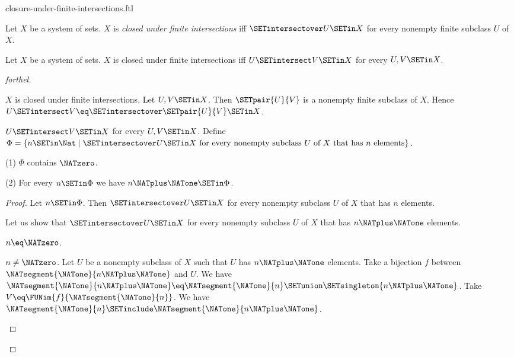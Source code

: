 \documentclass{naproche-library}
\begin{document}
\begin{smodule}[title=Closure Under Finite Intersections]{closure-under-finite-intersections.ftl}

\begin{definition}[forthel,id=FOUNDATIONS_14_4297814324543488]
  Let $X$ be a system of sets.
  $X$ is \emph{closed under finite intersections} iff $\SETintersectover U \SETin X$ for every nonempty finite subclass $U$ of $X$.
\end{definition}

\begin{proposition}[forthel,id=FOUNDATIONS_17_1405012582334464]
  Let $X$ be a system of sets.
  $X$ is closed under finite intersections iff $U \SETintersect V \SETin X$ for every $U, V \SETin X$.
\end{proposition}
\begin{proof}[forthel]
  \begin{case}{$X$ is closed under finite intersections.}
    Let $U, V \SETin X$.
    Then $\SETpair{U}{V}$ is a nonempty finite subclass of $X$.
    Hence $U \SETintersect V \eq \SETintersectover \SETpair{U}{V} \SETin X$.
  \end{case}

  \begin{case}{$U \SETintersect V \SETin X$ for every $U, V \SETin X$.}
    Define $\Phi = \{ n \SETin \Nat \mid \SETintersectover U \SETin X\text{ for every nonempty subclass }U\text{ of }X\text{ that has }n\text{ elements}\}$.

    (1) $\Phi$ contains $\NATzero$.

    (2) For every $n \SETin \Phi$ we have $n \NATplus \NATone \SETin \Phi$.
    \begin{proof}
      Let $n \SETin \Phi$.
      Then $\SETintersectover U \SETin X$ for every nonempty subclass $U$ of $X$ that has $n$ elements.

      Let us show that $\SETintersectover U \SETin X$ for every nonempty subclass $U$ of $X$ that has $n \NATplus \NATone$ elements.

        \begin{case}{$n \eq \NATzero$.} \end{case}

        \begin{case}{$n \neq \NATzero$.}
          Let $U$ be a nonempty subclass of $X$ such that $U$ has $n \NATplus \NATone$ elements.
          Take a bijection $f$ between $\NATsegment{\NATone}{n \NATplus \NATone}$ and $U$.
          We have $\NATsegment{\NATone}{n \NATplus \NATone} \eq \NATsegment{\NATone}{n} \SETunion \SETsingleton{n \NATplus \NATone}$.
          Take $V \eq \FUNim{f}{\NATsegment{\NATone}{n}}$.
          We have $\NATsegment{\NATone}{n} \SETinclude \NATsegment{\NATone}{n \NATplus \NATone}$.


\end{case}
\end{proof}
\end{case}
\end{proof}
\end{smodule}
\end{document}
